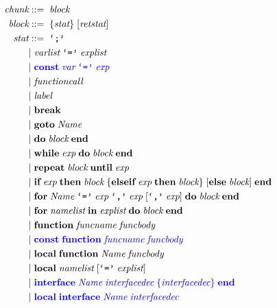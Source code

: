 \allowdisplaybreaks
\begin{align*}
\textit{chunk} & ::= \; \textit{block}\\
\textit{block} & ::= \; \{\textit{stat}\} \; [\textit{retstat}]\\
\textit{stat} & ::= \; \texttt{`;'}\\
& | \; \textit{varlist} \; \texttt{`='} \; \textit{explist}\\
& | \; \textcolor{blue}{\textbf{const} \; \textit{var} \; \texttt{`='} \; \textit{exp}}\\
& | \; \textit{functioncall}\\
& | \; \textit{label}\\
& | \; \textbf{break}\\ 
& | \; \textbf{goto} \; \textit{Name}\\
& | \; \textbf{do} \; \textit{block} \; \textbf{end}\\
& | \; \textbf{while} \; \textit{exp} \; \textbf{do} \; \textit{block} \; \textbf{end}\\
& | \; \textbf{repeat} \; \textit{block} \; \textbf{until} \; \textit{exp}\\
& | \; \textbf{if} \; \textit{exp} \; \textbf{then} \; \textit{block} \;
  \{\textbf{elseif} \; \textit{exp} \; \textbf{then} \; \textit{block}\} \;
  [\textbf{else} \; \textit{block}] \; \textbf{end}\\ 
& | \; \textbf{for} \; \textit{Name} \; \texttt{`='} \; \textit{exp} \;
  \texttt{`,'} \; \textit{exp} \; [\texttt{`,'} \; \textit{exp}] \;
  \textbf{do} \; \textit{block} \; \textbf{end}\\
& | \; \textbf{for} \; \textit{namelist} \; \textbf{in} \; \textit{explist} \;
  \textbf{do} \; \textit{block} \; \textbf{end}\\
& | \; \textbf{function} \; \textit{funcname} \; \textit{funcbody}\\
& | \; \textcolor{blue}{\textbf{const} \; \textbf{function} \; \textit{funcname} \; \textit{funcbody}}\\
& | \; \textbf{local} \; \textbf{function} \; \textit{Name} \; \textit{funcbody}\\
& | \; \textbf{local} \; \textit{namelist} \; [\texttt{`='} \; \textit{explist}]\\
& | \; \textcolor{blue}{\textbf{interface} \; \textit{Name} \; \textit{interfacedec} \;
  \{\textit{interfacedec}\} \; \textbf{end}}\\
& | \; \textcolor{blue}{\textbf{local} \; \textbf{interface} \; \textit{Name} \; \textit{interfacedec} \;
}
\end{align*}
